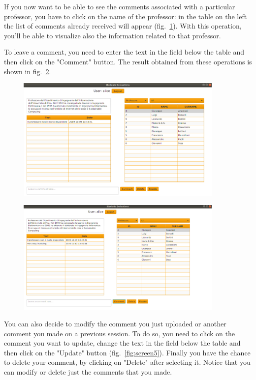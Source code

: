 \documentclass[a4paper, oneside]{article}
\begin{document}
If you now want to be able to see the comments associated with a particular professor, you have to click on the name of the professor: in the table on the left the list of comments already received will appear (fig.~\ref{fig:screen3}). With this operation, you'll be able to visualize also the information related to that professor.

To leave a comment, you need to enter the text in the field below the table and then click on the "Comment" button. The result obtained from these operations is shown in fig.~\ref{fig:screen4}.

\begin{figure}
\centering
\includegraphics[width=0.9\textwidth]{images/screens/screen3}
\label{fig:screen3}
\end{figure}

\begin{figure}
\centering
\includegraphics[width=0.9\textwidth]{images/screens/screen4}
\label{fig:screen4}
\end{figure}

You can also decide to modify the comment you just uploaded or another comment you made on a previous session. To do so, you need to click on the comment you want to update, change the text in the field below the table and then click on the "Update" button (fig.~\ref{fig:screen5}).
Finally you have the chance to delete your comment, by clicking on "Delete" after selecting it. Notice that you can modify or delete just the comments that you made.
\end{document}
